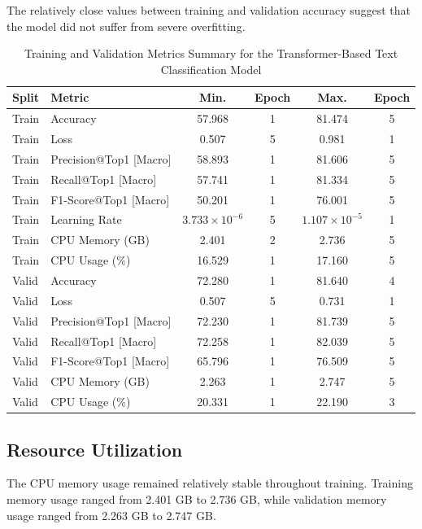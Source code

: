 \documentclass[11pt,a4paper]{article}
\begin{document}
The relatively close values between training and validation accuracy suggest that the model did not suffer from severe overfitting.

\begin{table}[h]
\centering
\caption{Training and Validation Metrics Summary for the Transformer-Based Text Classification Model}
\begin{tabular}{|l|l|c|c|c|c|}
\hline
\textbf{Split} & \textbf{Metric} & \textbf{Min.} & \textbf{Epoch} & \textbf{Max.} & \textbf{Epoch} \\
\hline
Train & Accuracy & 57.968 & 1 & 81.474 & 5 \\
Train & Loss & 0.507 & 5 & 0.981 & 1 \\
Train & Precision@Top1 [Macro] & 58.893 & 1 & 81.606 & 5 \\
Train & Recall@Top1 [Macro] & 57.741 & 1 & 81.334 & 5 \\
Train & F1-Score@Top1 [Macro] & 50.201 & 1 & 76.001 & 5 \\
Train & Learning Rate & $3.733 \times 10^{-6}$ & 5 & $1.107 \times 10^{-5}$ & 1 \\
Train & CPU Memory (GB) & 2.401 & 2 & 2.736 & 5 \\
Train & CPU Usage (\%) & 16.529 & 1 & 17.160 & 5 \\
\hline
Valid & Accuracy & 72.280 & 1 & 81.640 & 4 \\
Valid & Loss & 0.507 & 5 & 0.731 & 1 \\
Valid & Precision@Top1 [Macro] & 72.230 & 1 & 81.739 & 5 \\
Valid & Recall@Top1 [Macro] & 72.258 & 1 & 82.039 & 5 \\
Valid & F1-Score@Top1 [Macro] & 65.796 & 1 & 76.509 & 5 \\
Valid & CPU Memory (GB) & 2.263 & 1 & 2.747 & 5 \\
Valid & CPU Usage (\%) & 20.331 & 1 & 22.190 & 3 \\
\hline
\end{tabular}
\label{tab:transformer_text_classification_metrics}
\end{table}

\subsection{Resource Utilization}

The CPU memory usage remained relatively stable throughout training. Training memory usage ranged from 2.401 GB to 2.736 GB, while validation memory usage ranged from 2.263 GB to 2.747 GB.
\end{document}

